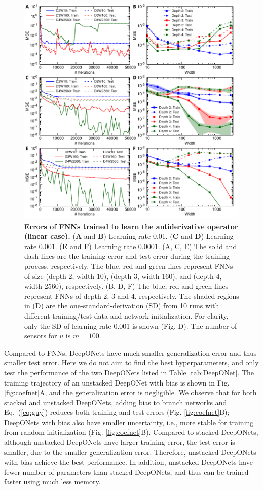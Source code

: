 \documentclass[11pt]{article}
\begin{document}
\begin{figure}[htbp]
\centering
\includegraphics{fnn.pdf}
\caption{\textbf{Errors of FNNs trained to learn the antiderivative operator (linear case).} (\textbf{A} and \textbf{B}) Learning rate 0.01. (\textbf{C} and \textbf{D}) Learning rate 0.001. (\textbf{E} and \textbf{F}) Learning rate 0.0001. (A, C, E) The solid and dash lines are the training error and test error during the training process, respectively. The blue, red and green lines represent FNNs of size (depth 2, width 10), (depth 3, width 160), and (depth 4, width 2560), respectively. (B, D, F) The blue, red and green lines represent FNNs of depth 2, 3 and 4, respectively. The shaded regions in (D) are the one-standard-derivation (SD) from 10 runs with different training/test data and network initialization. For clarity, only the SD of learning rate 0.001 is shown (Fig. D). The number of sensors for $u$ is $m=100$.}
\label{fig:fnn}
\end{figure}

Compared to FNNs, DeepONets have much smaller generalization error and thus smaller test error. Here we do not aim to find the best hyperparameters, and only test the performance of the two DeepONets listed in Table \ref{tab:DeepONet}. The training trajectory of an unstacked DeepONet with bias is shown in Fig. \ref{fig:coefnet}A, and the generalization error is negligible. We observe that for both stacked and unstacked DeepONets, adding bias to branch networks and Eq.~(\ref{eq:guy}) reduces both training and test errors (Fig. \ref{fig:coefnet}B); DeepONets with bias also have smaller uncertainty, i.e., more stable for training from random initialization (Fig. \ref{fig:coefnet}B). Compared to stacked DeepONets, although unstacked DeepONets have larger training error, the test error is smaller, due to the smaller generalization error. Therefore, unstacked DeepONets with bias achieve the best performance. In addition, unstacked DeepONets have fewer number of parameters than stacked DeepONets, and thus can be trained faster using much less memory.
\end{document}
